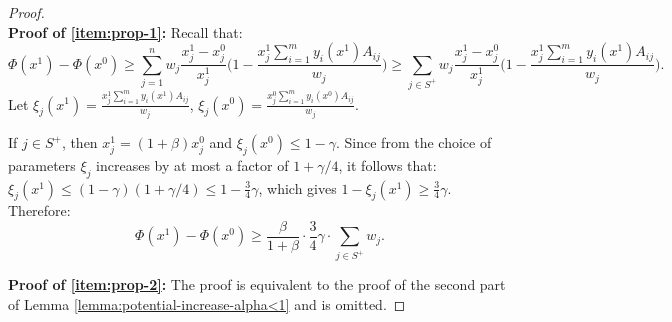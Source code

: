 \documentclass[11pt]{article}
\begin{document}
\begin{proof}
$\quad$\\
\noindent\textbf{Proof of \ref{item:prop-1}:}
Recall that:
\begin{equation*}
\Phi(x^1) - \Phi(x^0) \geq \sum_{j=1}^n w_j \frac{x_j^1 - x_j^0}{x_j^1}\Big( 1- \frac{x_j^1\sum_{i=1}^m y_i(x^1)A_{ij}}{w_j}\Big) \geq \sum_{j\in S^+} w_j \frac{x_j^1 - x_j^0}{x_j^1}\Big( 1- \frac{x_j^1\sum_{i=1}^m y_i(x^1)A_{ij}}{w_j}\Big).
\end{equation*}
Let $\xi_j(x^1) = \frac{x_j^1\sum_{i=1}^m y_i(x^1)A_{ij}}{w_j}$, $\xi_j(x^0) = \frac{x_j^0\sum_{i=1}^m y_i(x^0)A_{ij}}{w_j}$.

If $j\in S^+$, then $x_j^1 = (1+\beta)x_j^0$ and $\xi_j(x^0) \leq 1-\gamma$. Since from the choice of parameters $\xi_j$ increases by at most a factor of $1+\gamma/4$, it follows that: $\xi_j(x^1) \leq (1-\gamma)(1+\gamma/4)\leq 1 -\frac{3}{4}\gamma$, which gives $1 - \xi_j(x^1) \geq \frac{3}{4}\gamma$. Therefore:
\begin{equation*}
\Phi(x^1) - \Phi(x^0) \geq \frac{\beta}{1+\beta}\cdot \frac{3}{4}\gamma \cdot \sum_{j\in S^+} w_j.
\end{equation*}

\noindent\textbf{Proof of \ref{item:prop-2}:} The proof is equivalent to the proof of the second part of Lemma \ref{lemma:potential-increase-alpha<1} and is omitted.
 

\end{proof}
\end{document}
